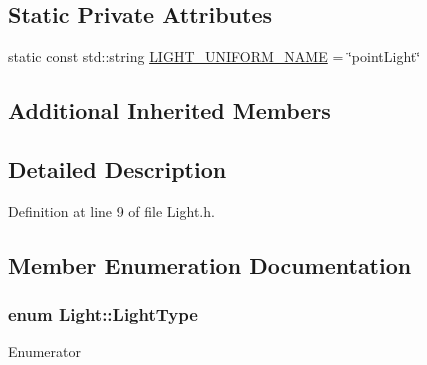 \subsection*{Static Private Attributes}
\begin{DoxyCompactItemize}
\item 
static const std\+::string \hyperlink{class_light_ab2d40f6c364cf728d03a90ff885e37cb}{L\+I\+G\+H\+T\+\_\+\+U\+N\+I\+F\+O\+R\+M\+\_\+\+N\+A\+M\+E} = \char`\"{}point\+Light\char`\"{}
\end{DoxyCompactItemize}
\subsection*{Additional Inherited Members}


\subsection{Detailed Description}


Definition at line 9 of file Light.\+h.



\subsection{Member Enumeration Documentation}
\hypertarget{class_light_a661d9480e01af8b1612860b9630ef5f8}{}
\subsubsection[{Light\+Type}]{\setlength{\rightskip}{0pt plus 5cm}enum {\bf Light\+::\+Light\+Type}\hspace{0.3cm}{\ttfamily [strong]}}\label{class_light_a661d9480e01af8b1612860b9630ef5f8}
\begin{Desc}
\item[Enumerator]\par
\begin{description}
\item[{\em 
\hypertarget{class_light_a661d9480e01af8b1612860b9630ef5f8a6eecfba72d12922ee1dead07a0ef3334}{}G\+L\+O\+B\+A\+L\label{class_light_a661d9480e01af8b1612860b9630ef5f8a6eecfba72d12922ee1dead07a0ef3334}
}]\item[{\em 
\hypertarget{class_light_a661d9480e01af8b1612860b9630ef5f8aaebdbcb765394d25d6a604589a890f82}{}P\+O\+I\+N\+T\label{class_light_a661d9480e01af8b1612860b9630ef5f8aaebdbcb765394d25d6a604589a890f82}
}]\end{description}
\end{Desc}



